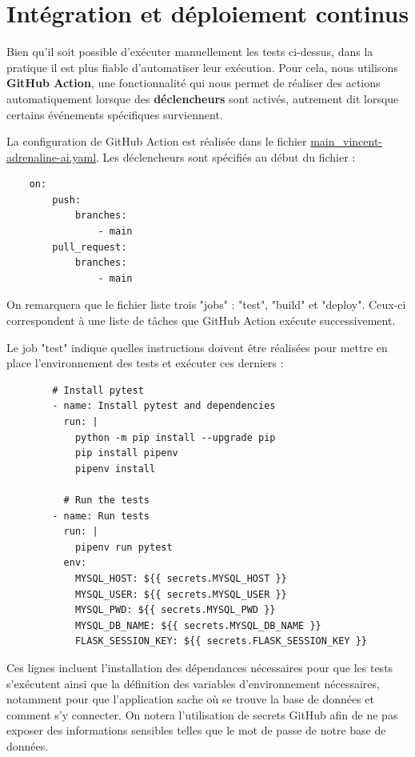 \documentclass[french]{article}
\begin{document}
    \section{Intégration et déploiement continus}

    Bien qu'il soit possible d'exécuter manuellement les tests ci-dessus, dans la pratique il est plus fiable d'automatiser leur exécution. Pour cela, nous utilisons \textbf{GitHub Action}, une fonctionnalité qui nous permet de réaliser des actions automatiquement lorsque des \textbf{déclencheurs} sont activés, autrement dit lorsque certains événements spécifiques surviennent.

    La configuration de GitHub Action est réalisée dans le fichier \href{https://github.com/vinpap/adrenaline.ai/blob/main/.github/workflows/main_vincent-adrenaline-ai.yml}{main\_vincent-adrenaline-ai.yaml}. Les déclencheurs sont spécifiés au début du fichier :

    \begin{verbatim}
    on:
        push:
            branches:
                - main
        pull_request:
            branches:
                - main
    \end{verbatim}

    On remarquera que le fichier liste trois "jobs" : "test", "build" et "deploy". Ceux-ci correspondent à une liste de tâches que GitHub Action exécute successivement. 

    Le job "test" indique quelles instructions doivent être réalisées pour mettre en place l'environnement des tests et exécuter ces derniers :

    \begin{verbatim}
        # Install pytest
        - name: Install pytest and dependencies
          run: |
            python -m pip install --upgrade pip
            pip install pipenv
            pipenv install
  
          # Run the tests
        - name: Run tests
          run: |
            pipenv run pytest
          env: 
            MYSQL_HOST: ${{ secrets.MYSQL_HOST }}
            MYSQL_USER: ${{ secrets.MYSQL_USER }}
            MYSQL_PWD: ${{ secrets.MYSQL_PWD }}
            MYSQL_DB_NAME: ${{ secrets.MYSQL_DB_NAME }}
            FLASK_SESSION_KEY: ${{ secrets.FLASK_SESSION_KEY }}
    \end{verbatim}

    Ces lignes incluent l'installation des dépendances nécessaires pour que les tests s'exécutent ainsi que la définition des variables d'environnement nécessaires, notamment pour que l'application sache où se trouve la base de données et comment s'y connecter. On notera l'utilisation de secrets GitHub afin de ne pas exposer des informations sensibles telles que le mot de passe de notre base de données.
\end{document}
